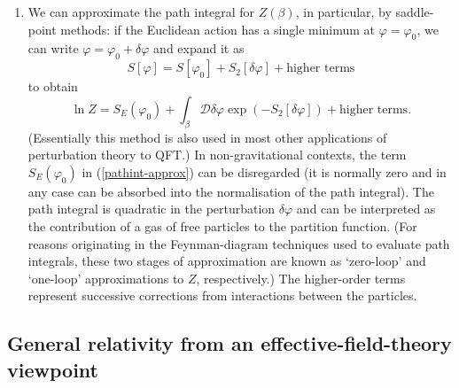 \documentclass{article}
\newcommand{\mc}[1]{\ensuremath{\mathcal{#1}}}
\newcommand{\be}{\begin{equation}}
\newcommand{\ee}{\end{equation}}
\begin{document}
\begin{enumerate}
\item We can approximate the path integral for $Z(\beta)$, in particular, by saddle-point methods: if the Euclidean action has a single minimum at $\varphi=\varphi_0$, we can write $\varphi = \varphi_0 + \delta \varphi$ and expand it as
\be
S[\varphi]=S[\varphi_0] + S_2[\delta \varphi] + \mbox{higher terms}
\ee
to obtain
\be \label{pathint-approx}
\ln Z = S_E(\varphi_0) + \int_\beta \mc{D}\delta\varphi \exp(- S_2[\delta \varphi]) + \mbox{higher terms}.
\ee
(Essentially this method is also used in most other applications of perturbation theory to QFT.) 
In non-gravitational contexts, the term $S_E(\varphi_0)$ in (\ref{pathint-approx}) can be disregarded (it is normally zero and in any case can be absorbed into the normalisation of the path integral). The path integral is quadratic in the perturbation $\delta \varphi$ and can be interpreted as the contribution of a gas of free particles to the partition function. (For reasons originating in the Feynman-diagram techniques used to evaluate path integrals, these two stages of approximation are known as `zero-loop' and `one-loop' approximations to $Z$, respectively.) The higher-order terms represent successive corrections from interactions between the particles.
\end{enumerate}

\subsection{General relativity from an effective-field-theory viewpoint}
\end{document}
